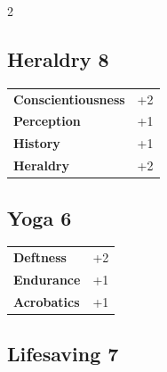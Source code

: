 \begin{multicols}{2}
\begin{tcolorbox}
\end{tcolorbox}

\begin{tcolorbox}
    \subsection*{Heraldry \hfill \small{8 }}
    \tcblower




\begin{tabular}{@{}ll@{}}
    \textbf{Conscientiousness} & +2\\
    \textbf{Perception} & +1\\
    \textbf{History} & +1\\
    \textbf{Heraldry} & +2\\
\end{tabular}


\end{tcolorbox}

\begin{tcolorbox}
    \subsection*{Yoga \hfill \small{6 }}
    \tcblower




\begin{tabular}{@{}ll@{}}
    \textbf{Deftness} & +2\\
    \textbf{Endurance} & +1\\
    \textbf{Acrobatics} & +1\\
\end{tabular}


\end{tcolorbox}

\begin{tcolorbox}
    \subsection*{Lifesaving \hfill \small{7 }}
    \tcblower





\end{tcolorbox}
\end{multicols}
